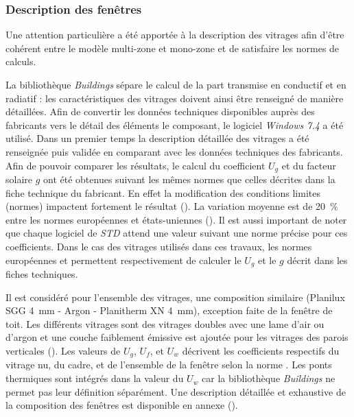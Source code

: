 \subsubsection{Description des fenêtres} %
\label{ssub:description_des_fenetres}
Une attention particulière a été apportée à la description des vitrages afin
d’être cohérent entre le modèle multi-zone et mono-zone et de satisfaire les normes
de calculs.

La bibliothèque \textit{Buildings} sépare le calcul de la part transmise en
conductif et en radiatif : les caractéristiques des vitrages doivent ainsi être
renseigné de manière détaillées. Afin de convertir les données techniques
disponibles auprès des fabricants vers le détail des éléments le composant, le
logiciel \textit{Windows 7.4} a été utilisé. Dans un premier temps la
description détaillée des vitrages a été renseignée puis validée en comparant
avec les données techniques des fabricants. Afin de pouvoir comparer les
résultats, le calcul du coefficient $U_{g}$ et du facteur solaire $g$ ont été
obtenues suivant les mêmes normes que celles décrites dans la fiche technique du
fabricant. En effet la modification des conditions limites (normes) impactent
fortement le résultat (). La variation moyenne est de
\SI{20}{\percent} entre les normes européennes et états-uniennes (). Il est aussi important de noter que chaque logiciel de \emph{STD} attend
une valeur suivant une norme précise pour ces coefficients. Dans le cas des
vitrages utilisés dans ces travaux, les normes européennes
 et  permettent respectivement
de calculer le $U_{g}$ et le $g$ décrit dans les fiches techniques.

Il est considéré pour l’ensemble des vitrages, une composition similaire
(Planilux SGG \SI{4}{mm} - Argon - Planitherm XN \SI{4}{mm}), exception faite de
la fenêtre de toit. Les différents vitrages sont des vitrages doubles avec une
lame d’air ou d’argon et une couche faiblement émissive est ajoutée pour les
vitrages des parois verticales (). Les valeurs de
$U_{g}$, $U_{f}$, et $U_{w}$ décrivent les coefficients respectifs du vitrage
nu, du cadre, et de l’ensemble de la fenêtre selon la norme . Les ponts thermiques sont intégrés dans la valeur du $U_{w}$ car la
bibliothèque \textit{Buildings} ne permet pas leur définition séparément. Une
description détaillée et exhaustive de la composition des fenêtres est
disponible en annexe ().


